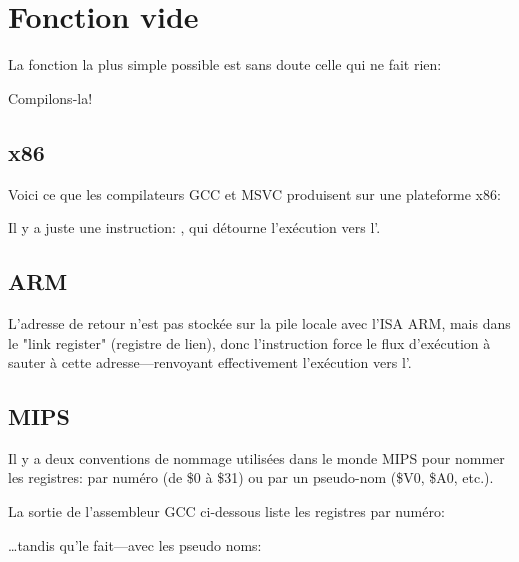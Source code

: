 ﻿\section{Fonction vide}
\label{empty_func}

La fonction la plus simple possible est sans doute celle qui ne fait rien:



Compilons-la!

\subsection{x86}

Voici ce que les compilateurs GCC et MSVC produisent sur une plateforme x86:



Il y a juste une instruction: \RET, qui détourne l'exécution vers l'.

\subsection{ARM}



L'adresse de retour n'est pas stockée sur la pile locale avec l'\ac{ISA} ARM, mais
dans le "link register" (registre de lien), %
donc l'instruction  force le flux d'exécution à sauter à cette adresse---renvoyant
effectivement l'exécution vers l'.

\subsection{MIPS}

Il y a deux conventions de nommage utilisées dans le monde MIPS pour nommer les registres:
par numéro (de \$0 à \$31) ou par un pseudo-nom (\$V0, \$A0, etc.).

La sortie de l'assembleur GCC ci-dessous liste les registres par numéro:



\dots tandis qu'\IDA le fait---avec les pseudo noms:

